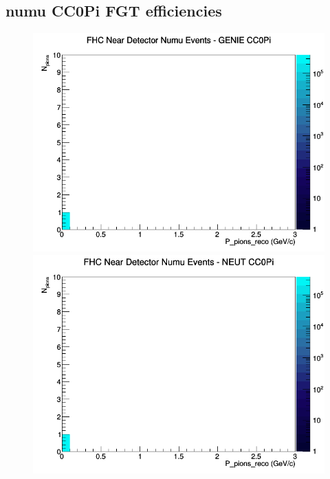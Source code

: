 \documentclass[12pt]{article}
\begin{document}
\subsection{numu CC0Pi FGT efficiencies}
\begin{figure}[h]
\includegraphics[width=\linewidth]{eff_N_P/FGT/pions/CC0Pi_FHC_ND_numu_N_P_GENIE.png}
\endminipage
{}
\includegraphics[width=\linewidth]{eff_N_P/FGT/pions/CC0Pi_FHC_ND_numu_N_P_NEUT.png}
\endminipage
{}

\end{figure}
\end{document}
